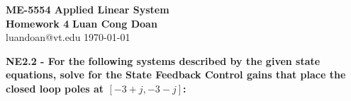\documentclass[14pt,a4paper]{article}
\begin{document}
\label{cover}
\begin{center}
	\vspace*{3cm}
	\large{\textbf{ME-5554 Applied Linear System \\ Homework 4}}
	\vfill
	\textbf{Luan Cong Doan} \\ luandoan@vt.edu
	\vfill
	\today
\end{center}
\pagebreak

\label{Answer Sheet}
\label{Numerical Exercise}
\large\textbf{NE2.2 - For the following systems described by the given state equations, solve for the State Feedback Control gains that place the closed loop poles at $[-3+j, -3-j]$:}\\
\end{document}

